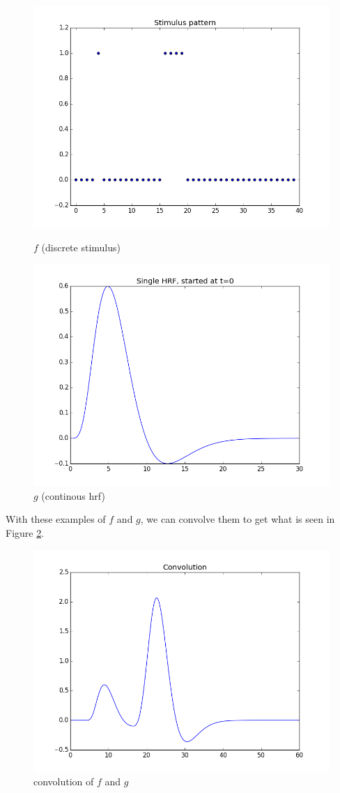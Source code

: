 \documentclass[11pt]{article}
\begin{document}
\begin{figure}[ht]
\centering
\begin{minipage}[b]{0.45\linewidth}
	\centering
	\includegraphics[width=.8\linewidth]{images/on_off_pattern.png} 
	\caption{$f$ (discrete stimulus)}
	\label{fig:on_off}
\end{minipage}	
\quad
\begin{minipage}[b]{0.45\linewidth}
	\centering
	\includegraphics[width=.8\linewidth]{images/hrf_pattern.png} 
	\caption{$g$ (continous hrf)}
	\label{fig:hrf}
\end{minipage}
\end{figure}

With these examples of $f$ and $g$, we can convolve them to get what is 
seen in Figure \ref{fig:convolve1}.

\begin{figure}[ht]
	\centering
	\includegraphics[width=.5\linewidth]{images/initial_convolved.png}
	\caption{convolution of $f$ and $g$}
	\label{fig:convolve1}
\end{figure}
\end{document}
